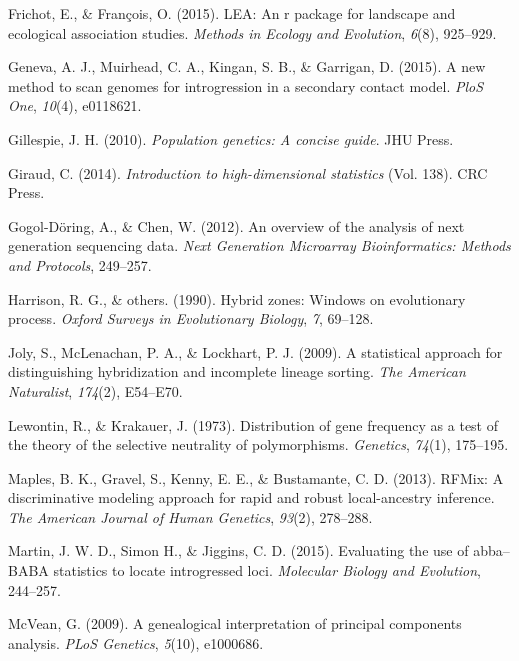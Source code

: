 \documentclass[12pt,twoside]{reedthesis}
\begin{document}
  \hypertarget{ref-frichot2015lea}{}
  Frichot, E., \& François, O. (2015). LEA: An r package for landscape and
  ecological association studies. \emph{Methods in Ecology and Evolution},
  \emph{6}(8), 925--929.
  
  \hypertarget{ref-geneva2015new}{}
  Geneva, A. J., Muirhead, C. A., Kingan, S. B., \& Garrigan, D. (2015). A
  new method to scan genomes for introgression in a secondary contact
  model. \emph{PloS One}, \emph{10}(4), e0118621.
  
  \hypertarget{ref-gillespie2010population}{}
  Gillespie, J. H. (2010). \emph{Population genetics: A concise guide}.
  JHU Press.
  
  \hypertarget{ref-giraud2014introduction}{}
  Giraud, C. (2014). \emph{Introduction to high-dimensional statistics}
  (Vol. 138). CRC Press.
  
  \hypertarget{ref-gogol2012overview}{}
  Gogol-Döring, A., \& Chen, W. (2012). An overview of the analysis of
  next generation sequencing data. \emph{Next Generation Microarray
  Bioinformatics: Methods and Protocols}, 249--257.
  
  \hypertarget{ref-harrison1990hybrid}{}
  Harrison, R. G., \& others. (1990). Hybrid zones: Windows on
  evolutionary process. \emph{Oxford Surveys in Evolutionary Biology},
  \emph{7}, 69--128.
  
  \hypertarget{ref-joly2009statistical}{}
  Joly, S., McLenachan, P. A., \& Lockhart, P. J. (2009). A statistical
  approach for distinguishing hybridization and incomplete lineage
  sorting. \emph{The American Naturalist}, \emph{174}(2), E54--E70.
  
  \hypertarget{ref-lewontin1973distribution}{}
  Lewontin, R., \& Krakauer, J. (1973). Distribution of gene frequency as
  a test of the theory of the selective neutrality of polymorphisms.
  \emph{Genetics}, \emph{74}(1), 175--195.
  
  \hypertarget{ref-maples2013rfmix}{}
  Maples, B. K., Gravel, S., Kenny, E. E., \& Bustamante, C. D. (2013).
  RFMix: A discriminative modeling approach for rapid and robust
  local-ancestry inference. \emph{The American Journal of Human Genetics},
  \emph{93}(2), 278--288.
  
  \hypertarget{ref-martin2000}{}
  Martin, J. W. D., Simon H., \& Jiggins, C. D. (2015). Evaluating the use
  of abba--BABA statistics to locate introgressed loci. \emph{Molecular
  Biology and Evolution}, 244--257.
  
  \hypertarget{ref-mcvean2009genealogical}{}
  McVean, G. (2009). A genealogical interpretation of principal components
  analysis. \emph{PLoS Genetics}, \emph{5}(10), e1000686.
  
\end{document}

